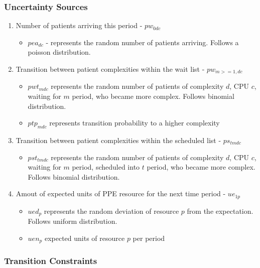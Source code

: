 \documentclass{article}
\begin{document}
\subsubsection{Uncertainty Sources}
\begin{enumerate}
    	
	\item Number of patients arriving this period - $pw_{0dc}$
		\begin{itemize}
			\item $pea_{dc}$ - represents the random number of patients arriving. Follows a poisson distribution.
		\end{itemize}
	
	\item Transition between patient complexities within the wait list - $pw_{m>=1,dc}$
		\begin{itemize}
			\item $pwt_{mdc}$ represents the random number of patients of complexity $d$, CPU $c$, waiting for $m$ period, who became more complex. Follows binomial distribution.
			\item $ptp_{mdc}$ represents transition probability to a higher complexity
		\end{itemize}
		
	\item Transition between patient complexities within the scheduled list - $ps_{tmdc}$
		\begin{itemize}
			\item $pst_{tmdc}$ represents the random number of patients of complexity $d$, CPU $c$, waiting for $m$ period, scheduled into $t$ period, who became more complex. Follows binomial distribution.
		\end{itemize}

	\item Amout of expected units of PPE resource for the next time period - $ue_{1p}$
		\begin{itemize}
			\item $ued_{p}$ represents the random deviation of resource $p$ from the expectation. Follows uniform distribution.
			\item $uen_{p}$ expected units of resource $p$ per period
		\end{itemize}
\end{enumerate}

\subsubsection{Transition Constraints}
\end{document}

